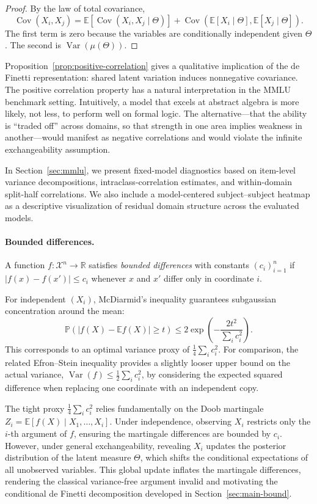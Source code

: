 \documentclass[11pt]{article}
\DeclareMathOperator{\Var}{Var}
\DeclareMathOperator{\Cov}{Cov}
\newcommand{\E}{\mathbb{E}}
\newcommand{\Pbb}{\mathbb{P}}
\newcommand{\R}{\mathbb{R}}
\theoremstyle{definition}
\theoremstyle{remark}
\begin{document}
\begin{proof}
By the law of total covariance,
\[
\Cov(X_i,X_j)
=
\E[\Cov(X_i,X_j\mid\Theta)]
+
\Cov(\E[X_i\mid\Theta],\E[X_j\mid\Theta]).
\]
The first term is zero because the variables are conditionally independent given $\Theta$.  The second is $\Var(\mu(\Theta))$.
\end{proof}

Proposition~\ref{prop:positive-correlation} gives a qualitative implication of
the de Finetti representation: shared latent variation induces nonnegative covariance. The positive correlation property has a natural interpretation in the MMLU benchmark setting. Intuitively, a model that excels at abstract algebra is more likely, not less, to perform well on formal logic. The alternative---that the ability is ``traded off'' across domains, so that strength in one area implies weakness in another---would manifest as negative correlations and would violate the infinite exchangeability assumption.


In Section~\ref{sec:mmlu}, we present fixed-model diagnostics based on item-level variance decompositions, intraclass-correlation estimates, and within-domain split-half correlations. We also include a model-centered subject--subject heatmap as a descriptive visualization of residual domain structure across the evaluated models. 



\paragraph{Bounded differences.}
A function $f:\mathcal{X}^n \to \R$ satisfies \emph{bounded differences}
with constants $(c_i)_{i=1}^n$ if $|f(x)-f(x')| \le c_i$ whenever $x$ and $x'$
differ only in coordinate $i$. 

For independent $(X_i)$, McDiarmid's inequality \citep{mcdiarmid1989method} guarantees subgaussian concentration around the mean:
\[
    \Pbb(|f(X)-\E f(X)|\ge t)
    \le
    2\exp\!\left(-\frac{2t^2}{\sum_i c_i^2}\right).
\]
This corresponds to an optimal variance proxy of $\frac{1}{4}\sum_i c_i^2$. For comparison, the related Efron--Stein inequality \citep{efron1981jackknife} provides a slightly looser upper bound on the actual variance, $\Var(f) \le \frac{1}{2}\sum_i c_i^2$, by considering the expected squared difference when replacing one coordinate with an independent copy.

The tight proxy $\frac{1}{4}\sum_i c_i^2$ relies fundamentally on the Doob martingale $Z_i = \E[f(X) \mid X_1, \dots, X_i]$. Under independence, observing $X_i$ restricts only the $i$-th argument of $f$, ensuring the martingale differences are bounded by $c_i$. However, under general exchangeability, revealing $X_i$ updates the posterior distribution of the latent measure $\Theta$, which shifts the conditional expectations of all unobserved variables. This global update inflates the martingale differences, rendering the classical variance-free argument invalid and motivating the conditional de Finetti decomposition developed in Section~\ref{sec:main-bound}.
\end{document}
